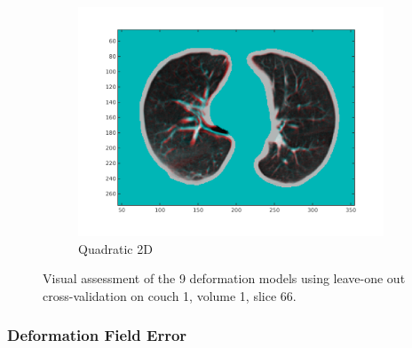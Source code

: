 \documentclass[11pt,a4paper,oneside]{report}
\begin{document}
\begin{figure}[H]
\begin{subfigure}[b]{0.33\textwidth}
    \includegraphics[width=\textwidth, trim=0 50 0 0,clip=true]{figures/task4/visAss_m3.png}
    \caption{Quadratic 2D}
  \end{subfigure}

    \caption{Visual assessment of the 9 deformation models using leave-one out cross-validation on couch 1, volume 1, slice 66. }
  \label{fig:c4visAss}
  
\end{figure}

\subsubsection*{Deformation Field Error}

\newcommand{\trimval}{140}
\newcommand{\trimvalleg}{140}
\end{document}
